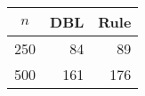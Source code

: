 \documentclass{article}
\begin{document}
\begin{tabular}{lrr}
   \hline
 
         \multicolumn{1}{c}{$n$} & \multicolumn{1}{c}{DBL}& \multicolumn{1}{c}{Rule} \\ \hline
    250 & 84 & 89 \\ 
  500 & 161 & 176 \\ 
   \hline
\end{tabular}
\end{document}
